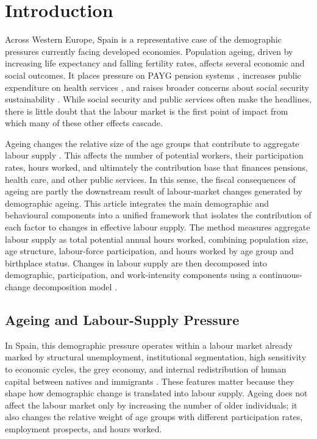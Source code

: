 \section{Introduction}
Across Western Europe, Spain is a representative case of the demographic pressures currently facing developed economies. Population ageing, driven by increasing life expectancy and falling fertility rates, affects several economic and social outcomes. It places pressure on PAYG pension systems \parencite{diaz2009delaying,boeri2024pay}, increases public expenditure on health services \parencite{cristea2020impact,aiyar2016impact,bijak2007population}, and raises broader concerns about social security sustainability \parencite{failde2021perspective}. While social security and public services often make the headlines, there is little doubt that the labour market is the first point of impact from which many of these other effects cascade.

\vspace{0.7em}\par
Ageing changes the relative size of the age groups that contribute to aggregate labour supply \parencite{maestas2023effect}. This affects the number of potential workers, their participation rates, hours worked, and ultimately the contribution base that finances pensions, health care, and other public services. In this sense, the fiscal consequences of ageing are partly the downstream result of labour-market changes generated by demographic ageing. This article integrates the main demographic and behavioural components into a unified framework that isolates the contribution of each factor to changes in effective labour supply. The method measures aggregate labour supply as total potential annual hours worked, combining population size, age structure, labour-force participation, and hours worked by age group and birthplace status. Changes in labour supply are then decomposed into demographic, participation, and work-intensity components using a continuous-change decomposition model \parencite{horiuchiDecompositionMethodBased2008}.



\subsection{Ageing and Labour-Supply Pressure}

In Spain, this demographic pressure operates within a labour market already marked by structural unemployment, institutional segmentation, high sensitivity to economic cycles, the grey economy, and internal redistribution of human capital between natives and immigrants \parencite{bentolila1990mismatch,bentolila2010two,congregado2014unemployment,guell2021so,bentolila2020dual}. These features matter because they shape how demographic change is translated into labour supply. Ageing does not affect the labour market only by increasing the number of older individuals; it also changes the relative weight of age groups with different participation rates, employment prospects, and hours worked.

